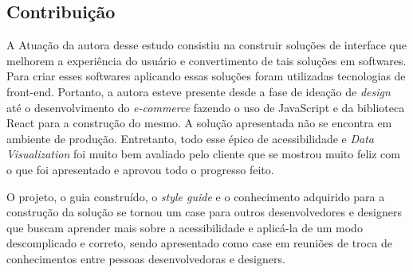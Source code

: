  
\subsection{Contribuição}
{

 A Atuação da autora desse estudo consistiu na construir soluções de interface que melhorem a experiência do usuário e convertimento de tais soluções em softwares. Para criar esses softwares aplicando essas soluções foram utilizadas tecnologias de front-end. Portanto, a autora esteve presente desde a fase de ideação de \textit{design} até o desenvolvimento do \textit{e-commerce} fazendo o uso de JavaScript e da biblioteca React \cite{REACT} para a construção do mesmo. A solução apresentada não se encontra em ambiente de produção. Entretanto, todo esse épico de acessibilidade e \textit{Data Visualization} foi muito bem avaliado pelo cliente que se mostrou muito feliz com o que foi apresentado e aprovou todo o progresso feito.

O projeto, o guia construído, o \textit{style guide} \cite{STYLE} e o conhecimento adquirido para a construção da solução se tornou um case para outros desenvolvedores e designers que buscam aprender mais sobre a acessibilidade e aplicá-la de um modo descomplicado e correto, sendo apresentado como case em reuniões de troca de conhecimentos entre pessoas desenvolvedoras e designers.  

}